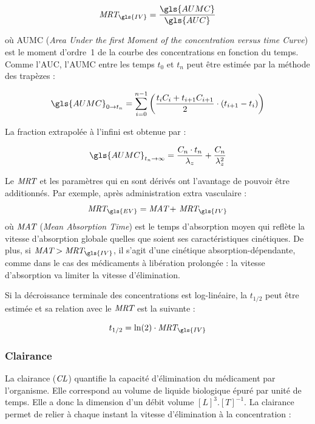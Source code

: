 \begin{equation}
\MRT_{\gls{IV}} = \frac{\gls{AUMC}}{\gls{AUC}}
\label{eq:6}
\end{equation}

où \gls{AUMC} (\textit{Area Under the first Moment of the concentration versus time Curve}) est le moment d'ordre~1 de la courbe des concentrations en fonction du temps. Comme l'\gls{AUC}, l'\gls{AUMC} entre les temps $t_0$ et $t_n$ peut être estimée par la méthode des trapèzes :

\begin{equation}
\gls{AUMC}_{0 \to t_n} = \sum_{i=0}^{n-1}\left ( \frac{t_i C_i + t_{i+1}C_{i+1}}{2}\cdot \left ( t_{i+1}-t_i \right ) \right )
\label{eq:7}
\end{equation}

La fraction extrapolée à l'infini est obtenue par :

\begin{equation}
\gls{AUMC}_{t_n \to \infty} = \frac{C_n \cdot t_n}{\lambda_z}+\frac{C_n }{\lambda_z^2}
\label{eq:8}
\end{equation}

Le $\operatorname{\textit{MRT}}$ et les paramètres qui en sont dérivés ont l'avantage de pouvoir être additionnés. Par exemple, après administration extra vasculaire :
\begin{equation}
\MRT_{\gls{EV}} = \MAT + \, \MRT_{\gls{IV}}
\label{eq:9}
\end{equation}
où $\operatorname{\textit{MAT}}$ (\textit{Mean Absorption Time}) est le temps d'absorption moyen qui reflète la vitesse d'absorption globale quelles que soient ses caractéristiques cinétiques. De plus, si $\MAT > \MRT_{\gls{IV}}$, il s'agit d'une cinétique absorption-dépendante, comme dans le cas des médicaments à libération prolongée : la vitesse d'absorption va limiter la vitesse d'élimination.

Si la décroissance terminale des concentrations est log-linéaire, la $t_{1/2}$ peut être estimée et sa relation avec le $\operatorname{\textit{MRT}}$ est la suivante :

\begin{equation}
t_{1/2} = \ln(2)\cdot \MRT_{\gls{IV}}
\label{eq:10}
\end{equation}

\subsubsection{Clairance} 
La clairance ($\operatorname{\textit{CL}}$) quantifie la capacité d'élimination du médicament par l'organisme. Elle correspond au volume de liquide biologique épuré par unité de temps. Elle a donc la dimension d'un débit volume $[L]^3.[T]^{-1}$. La clairance permet de relier à chaque instant la vitesse d'élimination à la concentration :

